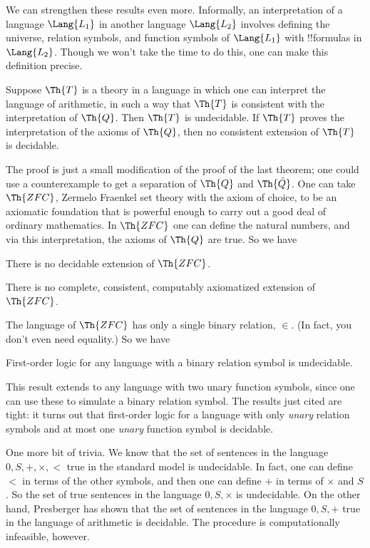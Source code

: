 \documentclass[../../include/open-logic-section]{subfiles}
\begin{document}


We can strengthen these results even more. Informally, an
interpretation of a language $\Lang{L_1}$ in another language
$\Lang{L_2}$ involves defining the universe, relation symbols, and
function symbols of $\Lang{L_1}$ with !!{formula}s in
$\Lang{L_2}$. Though we won't take the time to do this, one can make
this definition precise.

\begin{thm}
  Suppose $\Th{T}$ is a theory in a language in which one can
  interpret the language of arithmetic, in such a way that $\Th{T}$ is
  consistent with the interpretation of $\Th{Q}$. Then $\Th{T}$ is
  undecidable. If $\Th{T}$ proves the interpretation of the axioms of
  $\Th{Q}$, then no consistent extension of $\Th{T}$ is decidable.
\end{thm}

The proof is just a small modification of the proof of the last
theorem; one could use a counterexample to get a separation of $\Th{Q}$ and
$\Th{\bar Q}$. One can take $\Th{ZFC}$, Zermelo Fraenkel set theory with the
axiom of choice, to be an axiomatic foundation that is powerful enough
to carry out a good deal of ordinary mathematics. In $\Th{ZFC}$ one
can define the natural numbers, and via this interpretation, the
axioms of $\Th{Q}$ are true. So we have

\begin{cor}
There is no decidable extension of $\Th{ZFC}$.
\end{cor}

\begin{cor}
There is no complete, consistent, computably axiomatized extension of
$\Th{ZFC}$. 
\end{cor}

The language of $\Th{ZFC}$ has only a single binary relation,
$\in$. (In fact, you don't even need equality.) So we have

\begin{cor}
First-order logic for any language with a binary relation symbol is
undecidable.
\end{cor}

This result extends to any language with two unary function symbols,
since one can use these to simulate a binary relation symbol. The
results just cited are tight: it turns out that first-order logic for
a language with only {\em unary} relation symbols and at most one
{\em unary} function symbol is decidable.

One more bit of trivia. We know that the set of sentences in the
language $0,S,+,\times,<$ true in the standard model is
undecidable. In fact, one can define $<$ in terms of the other
symbols, and then one can define $+$ in terms of $\times$ and $S$. So
the set of true sentences in the language $0,S,\times$ is
undecidable. On the other hand, Presberger has shown that the set of
sentences in the language $0,S,+$ true in the language of arithmetic
is decidable. The procedure is computationally infeasible, however.
\end{document}
